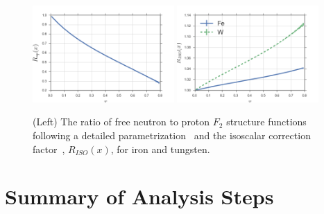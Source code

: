\begin{figure}
	\centering
	\includegraphics[width=0.48\textwidth]{figures/analysis/rnp.png}
	\includegraphics[width=0.48\textwidth]{figures/analysis/riso.png}
	\caption{(Left) The ratio of free neutron to proton $F_2$ structure functions following a detailed parametrization~\cite{Arrington:2008zh} and the isoscalar correction factor~\cite{Hen:2013oha}, $R_{ISO}(x)$, for iron and tungsten.}
	\label{fig:rnp-riso}
\end{figure}

\section{Summary of Analysis Steps}


